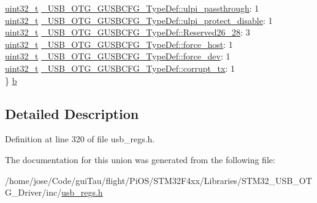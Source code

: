 \begin{DoxyCompactItemize}
\begin{tabbing}
\>\hyperlink{stdint_8h_a435d1572bf3f880d55459d9805097f62}{uint32\_t} \hyperlink{group___u_s_b___o_t_g___d_r_i_v_e_r_ga2cf182a5e9dc99ec69d9b6f686a42c62}{\_USB\_OTG\_GUSBCFG\_TypeDef::ulpi\_passthrough}: 1\\
\>\hyperlink{stdint_8h_a435d1572bf3f880d55459d9805097f62}{uint32\_t} \hyperlink{group___u_s_b___o_t_g___d_r_i_v_e_r_ga356191a03964927676f4b6734d28fda2}{\_USB\_OTG\_GUSBCFG\_TypeDef::ulpi\_protect\_disable}: 1\\
\>\hyperlink{stdint_8h_a435d1572bf3f880d55459d9805097f62}{uint32\_t} \hyperlink{group___u_s_b___o_t_g___d_r_i_v_e_r_ga3a67acf742f6ed9acbfd3a181ab5bb92}{\_USB\_OTG\_GUSBCFG\_TypeDef::Reserved26\_28}: 3\\
\>\hyperlink{stdint_8h_a435d1572bf3f880d55459d9805097f62}{uint32\_t} \hyperlink{group___u_s_b___o_t_g___d_r_i_v_e_r_ga1f36d10fc1b42a0a698de7c934f2e0e7}{\_USB\_OTG\_GUSBCFG\_TypeDef::force\_host}: 1\\
\>\hyperlink{stdint_8h_a435d1572bf3f880d55459d9805097f62}{uint32\_t} \hyperlink{group___u_s_b___o_t_g___d_r_i_v_e_r_ga5644ae82a540198fc40e0dce7fd1ca24}{\_USB\_OTG\_GUSBCFG\_TypeDef::force\_dev}: 1\\
\>\hyperlink{stdint_8h_a435d1572bf3f880d55459d9805097f62}{uint32\_t} \hyperlink{group___u_s_b___o_t_g___d_r_i_v_e_r_gad8162e80af3e0626d1a713bf558ead0a}{\_USB\_OTG\_GUSBCFG\_TypeDef::corrupt\_tx}: 1\\
\} \hyperlink{group___u_s_b___o_t_g___d_r_i_v_e_r_gaabf6e33f34eee31ed891109e34ee8fda}{b}\\

\end{tabbing}\end{DoxyCompactItemize}


\subsection{Detailed Description}


Definition at line 320 of file usb\-\_\-regs.\-h.



The documentation for this union was generated from the following file\-:\begin{DoxyCompactItemize}
\item 
/home/jose/\-Code/gui\-Tau/flight/\-Pi\-O\-S/\-S\-T\-M32\-F4xx/\-Libraries/\-S\-T\-M32\-\_\-\-U\-S\-B\-\_\-\-O\-T\-G\-\_\-\-Driver/inc/\hyperlink{_s_t_m32_f4xx_2_libraries_2_s_t_m32___u_s_b___o_t_g___driver_2inc_2usb__regs_8h}{usb\-\_\-regs.\-h}\end{DoxyCompactItemize}
